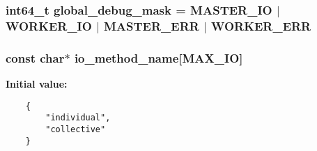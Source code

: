 \subsubsection{\setlength{\rightskip}{0pt plus 5cm}int64\_\-t \bf{global\_\-debug\_\-mask} = MASTER\_\-IO $|$ WORKER\_\-IO $|$ MASTER\_\-ERR $|$ WORKER\_\-ERR}\label{s3asim_8c_1931c00ae0b7104d5c1c7473116ae1e4}


\subsubsection{\setlength{\rightskip}{0pt plus 5cm}const char$\ast$ \bf{io\_\-method\_\-name}[MAX\_\-IO]\hspace{0.3cm}{\tt  [static]}}\label{s3asim_8c_578ea5b4a01e6c2b7056e3fef8e8fc01}


\textbf{Initial value:}

\begin{Code}\begin{verbatim} 
    {
        "individual",
        "collective"
    }
\end{verbatim}\end{Code}
